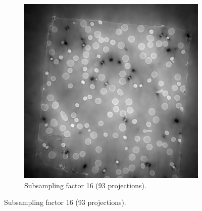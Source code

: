 \begin{figure}
\begin{subfigure}[t]{.45\textwidth}
    \includegraphics[width=\linewidth]{figures/ns16it100000itd4mse035logcosh3.png}
    \caption{Subsampling factor 16 (93 projections). }
  \end{subfigure}

  \medskip


\end{figure}
